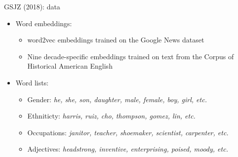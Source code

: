 \documentclass[usenames,dvipsnames,english]{beamer}
\begin{document}
\begin{frame}{GSJZ (2018): data}
\begin{itemize}
\setlength{\itemsep}{1.2em}
    \item Word embeddings:
    \begin{itemize}
    \setlength{\itemsep}{1.2em}
    \vspace{5pt}
        \item word2vec embeddings trained on the Google News dataset
        \item Nine decade-specific embeddings trained on text from the Corpus of Historical American English
    \end{itemize}
    \item Word lists: 
    \begin{itemize}
        \setlength{\itemsep}{1.2em}
        \vspace{5pt}
        \item Gender: \textit{he, she, son, daughter, male, female, boy, girl, etc.}
        \item Ethniticty: \textit{harris, ruiz, cho, thompson, gomez, lin, etc.}
        \item Occupations: \textit{janitor, teacher, shoemaker, scientist, carpenter, etc.}
        \item Adjectives: \textit{headstrong, inventive, enterprising, poised, moody, etc.}
    \end{itemize}
\end{itemize}
\end{frame}
\end{document}
